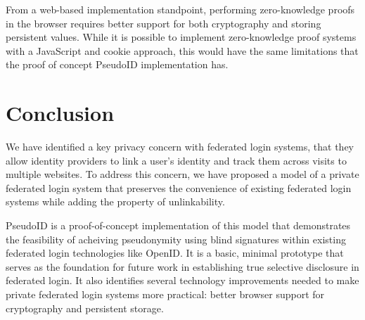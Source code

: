 \documentclass[11pt]{llncs}
\begin{document}
From a web-based implementation standpoint, performing zero-knowledge
proofs in the browser requires better support for both cryptography
and storing persistent values. While it is possible to implement
zero-knowledge proof systems with a JavaScript and cookie approach,
this would have the same limitations that the proof of concept
PseudoID implementation has.






\section{Conclusion}

We have identified a key privacy concern with federated login systems,
that they allow identity providers to link a user's identity
and track them across visits to multiple websites. To address this
concern, we have proposed a model of a private federated login
system that preserves the convenience of existing federated login
systems while adding the property of unlinkability.

PseudoID is a proof-of-concept implementation of this model that
demonstrates the feasibility of acheiving pseudonymity using
blind signatures within existing federated login technologies
like OpenID. It is a basic,
minimal prototype that serves as the foundation for future
work in establishing true selective disclosure in federated
login. It also identifies several technology improvements
needed to make private federated login systems more practical:
better browser support for cryptography and persistent storage.



\end{document}
